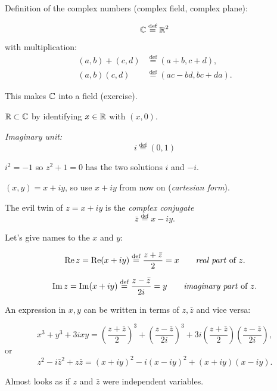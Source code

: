 \documentclass[10pt,aspectratio=169]{beamer}
\begin{document}
\begin{frame}
Definition of the complex numbers (complex field, complex plane):

\[
\C \overset{\text{def}}{=} \R^2
\]

with multiplication:
\begin{align*}
(a,b) + (c,d) & \overset{\text{def}}{=} (a+b,c+d) , \\
(a,b) (c,d) & \overset{\text{def}}{=} (ac-bd,bc+da) .
\end{align*}

\pause

This makes $\C$ into a field (exercise).

\pause
\medskip

$\R \subset \C$ by identifying $x \in \R$ with $(x,0)$.

\pause
\medskip

\emph{Imaginary unit:}
\[
i \overset{\text{def}}{=} (0,1)
\]

\pause
\medskip

$
i^2 = -1
$
\qquad so
$z^2+1=0$ has the two solutions $i$ and $-i$.
\end{frame}

\begin{frame}

$(x,y) = x+iy$, so use $x+iy$ from now on (\emph{cartesian form}).

\medskip
\pause

The evil twin of $z=x+iy$ is the \emph{complex conjugate}
\[
\bar{z} \overset{\text{def}}{=} x-iy.
\]

\medskip
\pause

Let's give names to the $x$ and $y$:

\[
\Re z = 
\Re (x+iy)
\overset{\text{def}}{=}
\frac{z+\bar{z}}{2}
= x
\qquad \text{\emph{real part} of } z .
\]

\pause

\[
\Im z = 
\Im (x+iy)
\overset{\text{def}}{=}
\frac{z-\bar{z}}{2i}
= y
\qquad \text{\emph{imaginary part} of } z .
\]

\pause

An expression in $x,y$ can be written in terms of $z,\bar{z}$
and vice versa:

\[
x^3 + y^3 + 3ixy
=
{\left( \frac{z+ \bar{z}}{2} \right)}^3 + 
{\left( \frac{z- \bar{z}}{2i} \right)}^3 + 
3i {\left( \frac{z+ \bar{z}}{2} \right)} 
{\left( \frac{z- \bar{z}}{2i} \right)} ,
\]
or
\[
z^2 - i \bar{z}^2 + z \bar{z}
=
{(x+iy)}^2 - i {(x-iy)}^2 + 
(x+iy)(x-iy) .
\]
\pause

Almost looks as if $z$ and $\bar{z}$ were independent variables.
\end{frame}
\end{document}
